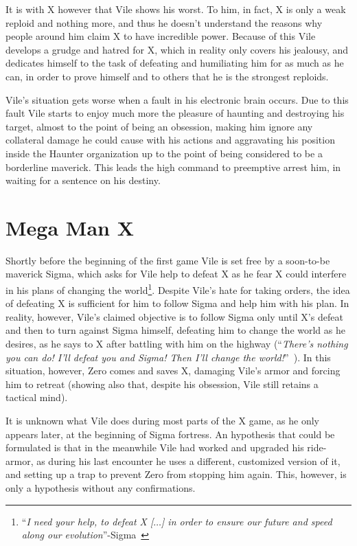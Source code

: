It is with X however that Vile shows his worst. To him, in fact, X is only a weak reploid and nothing more, and thus he doesn't understand the reasons why people around him claim X to have incredible power. Because of this Vile develops a grudge and hatred for X, which in reality only covers his jealousy, and dedicates himself to the task of defeating and humiliating him for as much as he can, in order to prove himself and to others that he is the strongest reploids.

Vile's situation gets worse when a fault in his electronic brain occurs. Due to this fault Vile starts to enjoy much more the pleasure of haunting and destroying his target, almost to the point of being an obsession, making him ignore any collateral damage he could cause with his actions and aggravating his position inside the Haunter organization up to the point of being considered to be a borderline maverick. This leads the high command  to preemptive arrest him, in waiting for a sentence on his destiny.

\section{Mega Man X}
Shortly before the beginning of the first game Vile is set free by a soon-to-be maverick Sigma, which asks for Vile help to defeat X as he fear X could interfere in his plans of changing the world\footnote{``\textit{I need your help, to defeat X [$\dots$] in order to ensure our future and speed along our evolution}''-Sigma~\cite{MHX:Vile_script}}. Despite Vile's hate for taking orders, the idea of defeating X is sufficient for him to follow Sigma and help him with his plan. In reality, however, Vile's claimed objective is to follow Sigma only until X's defeat and then to turn against Sigma himself, defeating him to change the world as he desires, as he says to X after battling with him on the highway (``\textit{There's nothing you can do! I'll defeat you and Sigma! Then I'll change the world!}''~\cite{wiki:MM_MHX_script}). In this situation, however, Zero comes and saves X, damaging Vile's armor and forcing him to retreat (showing also that, despite his obsession, Vile still retains a tactical mind). 

It is unknown what Vile does during most parts of the X game, as he only appears later, at the beginning of Sigma fortress. An hypothesis that could be  formulated is that in the meanwhile Vile had worked and upgraded his ride-armor, as during his last encounter he uses a different, customized version of it, and setting up a trap to prevent Zero from stopping him again. This, however, is only a hypothesis without any confirmations.

